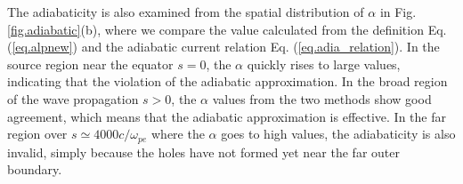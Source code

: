 
The adiabaticity is also examined from the spatial distribution of $\alpha$ in Fig. \ref{fig.adiabatic}(b), where we compare the value calculated from the definition Eq. (\ref{eq.alpnew}) and the adiabatic current relation Eq. (\ref{eq.adia_relation}). 
In the source region near the equator
$s=0$, the $\alpha$  
quickly rises to large values, indicating that the violation of the adiabatic approximation.
In the broad region of the wave propagation $s>0$, 
the $\alpha$ values 
from the two methods
show good agreement, 
which means that the adiabatic approximation is effective.
In the far region over $s\simeq4000c/\omega_{pe}$ where the  $\alpha$  goes to high values, the adiabaticity is also invalid, simply because the holes have not formed yet near the far outer boundary. 
